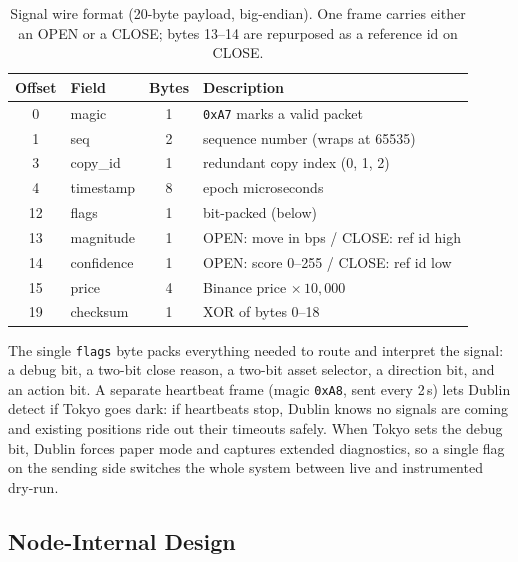 \documentclass{tmsce}
\begin{document}
\renewcommand{\arraystretch}{1.2}
\begin{table}[H]
  \centering
  \caption{Signal wire format (20-byte payload, big-endian). One frame carries
           either an OPEN or a CLOSE; bytes 13--14 are repurposed as a reference id
           on CLOSE.}
  \label{tab:protocol}
  \begin{tabular}{clcl}
    \toprule
    \textbf{Offset} & \textbf{Field} & \textbf{Bytes} & \textbf{Description} \\
    \midrule
    0  & magic        & 1 & \texttt{0xA7} marks a valid packet \\
    1  & seq          & 2 & sequence number (wraps at 65535) \\
    3  & copy\_id     & 1 & redundant copy index (0, 1, 2) \\
    4  & timestamp    & 8 & epoch microseconds \\
    12 & flags        & 1 & bit-packed (below) \\
    13 & magnitude    & 1 & OPEN: move in bps / CLOSE: ref id high \\
    14 & confidence   & 1 & OPEN: score 0--255 / CLOSE: ref id low \\
    15 & price        & 4 & Binance price $\times\,10{,}000$ \\
    19 & checksum     & 1 & XOR of bytes 0--18 \\
    \bottomrule
  \end{tabular}
\end{table}

\noindent The single \texttt{flags} byte packs everything needed to route and
interpret the signal: a debug bit, a two-bit close reason, a two-bit asset selector,
a direction bit, and an action bit. A separate heartbeat frame (magic \texttt{0xA8},
sent every 2\,s) lets Dublin detect if Tokyo goes dark: if heartbeats stop, Dublin
knows no signals are coming and existing positions ride out their timeouts safely.
When Tokyo sets the debug bit, Dublin forces paper mode and captures extended
diagnostics, so a single flag on the sending side switches the whole system between
live and instrumented dry-run.

\subsection{Node-Internal Design}
\end{document}
